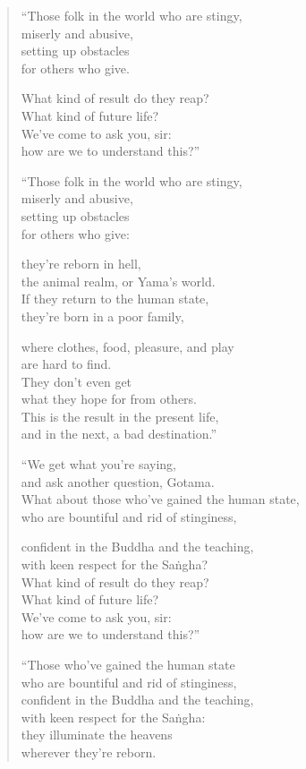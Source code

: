 \documentclass[12pt,openany]{book}%
\begin{document}
\begin{verse}%
“Those folk in the world who are stingy, \\
miserly and abusive, \\
setting up obstacles \\
for others who give. 

What kind of result do they reap? \\
What kind of future life? \\
We’ve come to ask you, sir: \\
how are we to understand this?” 

“Those folk in the world who are stingy, \\
miserly and abusive, \\
setting up obstacles \\
for others who give: 

they’re reborn in hell, \\
the animal realm, or Yama’s world. \\
If they return to the human state, \\
they’re born in a poor family, 

where clothes, food, pleasure, and play \\
are hard to find. \\
They don’t even get \\
what they hope for from others. \\
This is the result in the present life, \\
and in the next, a bad destination.” 

“We get what you’re saying, \\
and ask another question, Gotama. \\
What about those who’ve gained the human state, \\
who are bountiful and rid of stinginess, 

confident in the Buddha and the teaching, \\
with keen respect for the \textsanskrit{Saṅgha}? \\
What kind of result do they reap? \\
What kind of future life? \\
We’ve come to ask you, sir: \\
how are we to understand this?” 

“Those who’ve gained the human state \\
who are bountiful and rid of stinginess, \\
confident in the Buddha and the teaching, \\
with keen respect for the \textsanskrit{Saṅgha}: \\
they illuminate the heavens \\
wherever they’re reborn. 


\end{verse}
\end{document}
